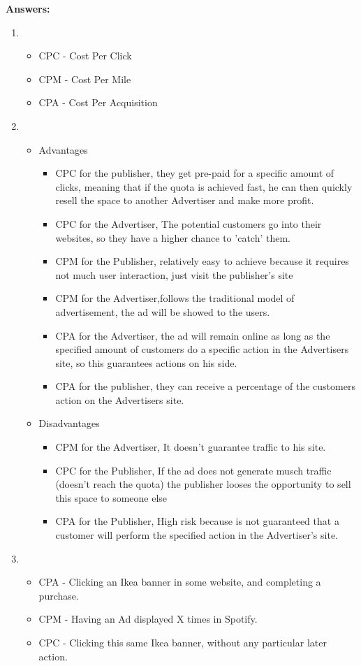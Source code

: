 \documentclass{WeSTassignment}
\begin{document}
\textbf{Answers:}
\begin{enumerate}
\item
\begin{itemize}
\item CPC - Cost Per Click
\item CPM - Cost Per Mile
\item CPA - Cost Per Acquisition
\end{itemize}
\item 
\begin{itemize}
\item Advantages
\begin{itemize}
\item CPC for the publisher, they get pre-paid for a specific amount of clicks, meaning that if the quota is achieved fast, he can then quickly resell the space to another Advertiser and make more profit.
\item CPC for the Advertiser, The potential customers go into their websites, so they have a higher chance to 'catch' them.
\item CPM for the Publisher, relatively easy to achieve because it requires not much user interaction, just visit the publisher's site
\item CPM for the Advertiser,follows the traditional model of advertisement, the ad will be showed to the users.
\item CPA for the Advertiser, the ad will remain online as long as the specified amount of customers do a specific action in the Advertisers site, so this guarantees actions on his side.
\item CPA for the publisher, they can receive a percentage of the customers action on the Advertisers site.
\end{itemize}

\item Disadvantages
\begin{itemize}
\item CPM for the Advertiser, It doesn't guarantee traffic to his site.
\item CPC for the Publisher, If the ad does not generate musch traffic (doesn't reach the quota) the publisher looses the opportunity to sell this space to someone else
\item CPA for the Publisher, High risk because is not guaranteed that a customer will perform the specified action in the Advertiser's site.
\end{itemize}
\end{itemize}

\item
\begin{itemize}
\item CPA - Clicking an Ikea banner in some website, and completing a purchase.
\item CPM - Having an Ad displayed X times in Spotify.
\item CPC - Clicking this same Ikea banner, without any particular later action.
\end{itemize}
\end{enumerate}
\end{document}
